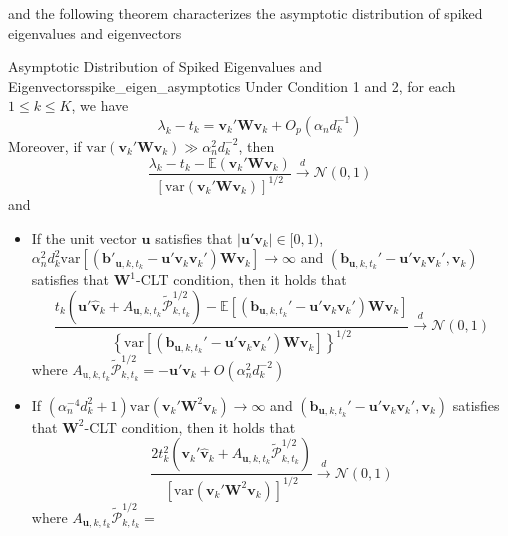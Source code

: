 \documentclass[twoside]{article}
\begin{document}
and the following theorem characterizes the asymptotic distribution of spiked eigenvalues and eigenvectors
\begin{theorem}{Asymptotic Distribution of Spiked Eigenvalues and Eigenvectors}{spike_eigen_asymptotics}
    Under Condition 1 and 2, for each $1\leq k \leq K$, we have 
    $$
    \lambda_k - t_k = \mathbf{v}_k'\mathbf{W}\mathbf{v}_k + O_p(\alpha_n d^{-1}_k)
    $$
    Moreover, if $\mathrm{var}\left(\mathbf{v}_k'\mathbf{W}\mathbf{v}_k\right) \gg \alpha^2_n d_k^{-2}$, then 
    $$
    \frac{\lambda_k -t_k - \mathbb{E}\left(\mathbf{v}_k' \mathbf{W} \mathbf{v}_k\right)}{\left[ \mathrm{var}\left(\mathbf{v}_k'\mathbf{W} \mathbf{v}_k\right) \right]^{1/2}} \xrightarrow{d} \mathcal{N}(0,1)
    $$
    and 
    \begin{itemize}
        \item If the unit vector $\mathbf{u}$ satisfies that $\left\vert \mathbf{u}'\mathbf{v}_k \right\vert \in [0,1)$, $\alpha^2_n d^2_k \mathrm{var}\left[ \left(\mathbf{b}'_{\mathbf{u},k,t_k} - \mathbf{u}'\mathbf{v}_k\mathbf{v}_k'\right)\mathbf{W}\mathbf{v}_k \right] \rightarrow \infty$ and 
        $\left( \mathbf{b}_{\mathbf{u},k,t_k}' - \mathbf{u}' \mathbf{v}_k\mathbf{v}_k',\mathbf{v}_k \right)$ satisfies that $\mathbf{W}^1$-CLT condition, then it holds that 
        \begin{equation*}
            \frac{t_k\left( \mathbf{u}'\hat{\mathbf{v}}_k + A_{\mathbf{u},k,t_k}\tilde{\mathcal{P}}^{1/2}_{k,t_k} \right) - \mathbb{E}\left[ \left( \mathbf{b}_{\mathbf{u},k,t_k}' - \mathbf{u}' \mathbf{v}_k\mathbf{v}_k' \right) \mathbf{Wv}_k \right] }{ \left\{ \mathrm{var} \left[ \left( \mathbf{b}_{\mathbf{u},k,t_k}' - \mathbf{u}' \mathbf{v}_k\mathbf{v}_k' \right) \mathbf{Wv}_k \right] \right\}^{1/2}} \xrightarrow{d}\mathcal{N}(0,1)
        \end{equation*}
        where $A_{\mathrm{u},k,t_k}\tilde{\mathcal{P}}^{1/2}_{k,t_k} = - \mathbf{u'v}_k + O(\alpha^2_nd_k^{-2})$
        \item If $\left( \alpha_n^{-4} d^2_k + 1 \right)\mathrm{var}\left( \mathbf{v}_k' \mathbf{W}^2 \mathbf{v}_k \right) \rightarrow \infty$ and $\left( \mathbf{b}_{\mathbf{u},k,t_k}' - \mathbf{u}' \mathbf{v}_k\mathbf{v}_k',\mathbf{v}_k \right)$ satisfies that $\mathbf{W}^2$-CLT condition, then it holds that 
        \begin{equation*}
            \frac{2t_k^2 \left( \mathbf{v}_k'\hat{\mathbf{v}}_k + A_{\mathbf{u},k,t_k} \tilde{\mathcal{P}}^{1/2}_{k,t_k} \right)}{ \left[ \mathrm{var}\left( \mathbf{v}_k' \mathbf{W}^2 \mathbf{v}_k \right) \right]^{1/2} } \xrightarrow{d} \mathcal{N}(0,1)
        \end{equation*}
        where $A_{\mathbf{u},k,t_k}\tilde{\mathcal{P}}_{k,t_k}^{1/2} = $
    \end{itemize}
\end{theorem}

\newpage


\end{document}
